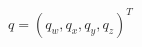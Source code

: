 \documentclass[preview]{standalone}
\begin{document}
\begin{center}
$q = (q_w, q_x, q_y, q_z)^T$
\end{center}
\end{document}
